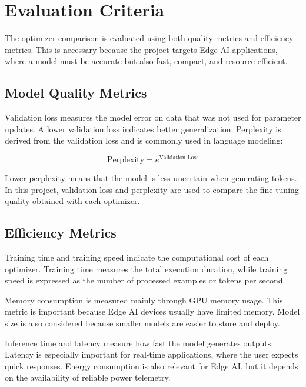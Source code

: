 \chapter{Evaluation Criteria}

\vspace*{0.3cm}

The optimizer comparison is evaluated using both quality metrics and efficiency
metrics. This is necessary because the project targets Edge AI applications,
where a model must be accurate but also fast, compact, and resource-efficient.

\section{Model Quality Metrics}

Validation loss measures the model error on data that was not used for parameter
updates. A lower validation loss indicates better generalization. Perplexity is
derived from the validation loss and is commonly used in language modeling:

\begin{equation}
    \text{Perplexity} = e^{\text{Validation Loss}}
\end{equation}

Lower perplexity means that the model is less uncertain when generating tokens.
In this project, validation loss and perplexity are used to compare the
fine-tuning quality obtained with each optimizer.

\section{Efficiency Metrics}

Training time and training speed indicate the computational cost of each
optimizer. Training time measures the total execution duration, while training
speed is expressed as the number of processed examples or tokens per second.

\vspace*{0.15cm}

Memory consumption is measured mainly through GPU memory usage. This metric is
important because Edge AI devices usually have limited memory. Model size is also
considered because smaller models are easier to store and deploy.

\vspace*{0.15cm}

Inference time and latency measure how fast the model generates outputs. Latency
is especially important for real-time applications, where the user expects quick
responses. Energy consumption is also relevant for Edge AI, but it depends on the
availability of reliable power telemetry.

